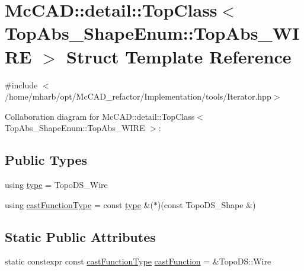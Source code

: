 \hypertarget{structMcCAD_1_1detail_1_1TopClass_3_01TopAbs__ShapeEnum_1_1TopAbs__WIRE_01_4}{}\section{Mc\+C\+AD\+:\+:detail\+:\+:Top\+Class$<$ Top\+Abs\+\_\+\+Shape\+Enum\+:\+:Top\+Abs\+\_\+\+W\+I\+RE $>$ Struct Template Reference}
\label{structMcCAD_1_1detail_1_1TopClass_3_01TopAbs__ShapeEnum_1_1TopAbs__WIRE_01_4}


{\ttfamily \#include $<$/home/mharb/opt/\+Mc\+C\+A\+D\+\_\+refactor/\+Implementation/tools/\+Iterator.\+hpp$>$}



Collaboration diagram for Mc\+C\+AD\+:\+:detail\+:\+:Top\+Class$<$ Top\+Abs\+\_\+\+Shape\+Enum\+:\+:Top\+Abs\+\_\+\+W\+I\+RE $>$\+:
\subsection*{Public Types}
\begin{DoxyCompactItemize}
\item 
using \hyperlink{structMcCAD_1_1detail_1_1TopClass_3_01TopAbs__ShapeEnum_1_1TopAbs__WIRE_01_4_a56e2df25e7b21da6053dffac1ff0401c}{type} = Topo\+D\+S\+\_\+\+Wire
\item 
using \hyperlink{structMcCAD_1_1detail_1_1TopClass_3_01TopAbs__ShapeEnum_1_1TopAbs__WIRE_01_4_a120749c40c7f17c80a8067ec30bcd47a}{cast\+Function\+Type} = const \hyperlink{structMcCAD_1_1detail_1_1TopClass_3_01TopAbs__ShapeEnum_1_1TopAbs__WIRE_01_4_a56e2df25e7b21da6053dffac1ff0401c}{type} \&($\ast$)(const Topo\+D\+S\+\_\+\+Shape \&)
\end{DoxyCompactItemize}
\subsection*{Static Public Attributes}
\begin{DoxyCompactItemize}
\item 
static constexpr const \hyperlink{structMcCAD_1_1detail_1_1TopClass_3_01TopAbs__ShapeEnum_1_1TopAbs__WIRE_01_4_a120749c40c7f17c80a8067ec30bcd47a}{cast\+Function\+Type} \hyperlink{structMcCAD_1_1detail_1_1TopClass_3_01TopAbs__ShapeEnum_1_1TopAbs__WIRE_01_4_a7d3259f17f4d328fbb015d9b9e1bb792}{cast\+Function} = \&Topo\+D\+S\+::\+Wire
\end{DoxyCompactItemize}


